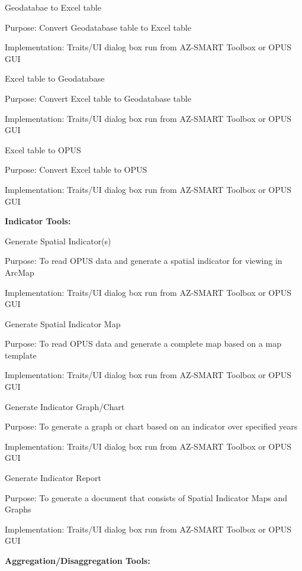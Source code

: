 \bigskip

Geodatabae to Excel table

Purpose: Convert Geodatabase table to Excel table

Implementation: Traits/UI dialog box run from AZ-SMART Toolbox or OPUS GUI

\bigskip

Excel table to Geodatabase

Purpose: Convert Excel table to Geodatabase table

Implementation: Traits/UI dialog box run from AZ-SMART Toolbox or OPUS GUI

\bigskip

Excel table to OPUS

Purpose: Convert Excel table to OPUS

Implementation: Traits/UI dialog box run from AZ-SMART Toolbox or OPUS GUI

\bigskip

\textbf{Indicator Tools:}

\bigskip

Generate Spatial Indicator(s)

Purpose: To read OPUS data and generate a spatial indicator for viewing in ArcMap

Implementation: Traits/UI dialog box run from AZ-SMART Toolbox or OPUS GUI

\bigskip

Generate Spatial Indicator Map

Purpose: To read OPUS data and generate a complete map based on a map template

Implementation: Traits/UI dialog box run from AZ-SMART Toolbox or OPUS GUI

\bigskip

Generate Indicator Graph/Chart

Purpose: To generate a graph or chart based on an indicator over specified years

Implementation: Traits/UI dialog box run from AZ-SMART Toolbox or OPUS GUI

\bigskip

Generate Indicator Report

Purpose: To generate a document that consists of Spatial Indicator Maps and Graphs

Implementation: Traits/UI dialog box run from AZ-SMART Toolbox or OPUS GUI

\bigskip

\textbf{Aggregation/Disaggregation Tools:}

